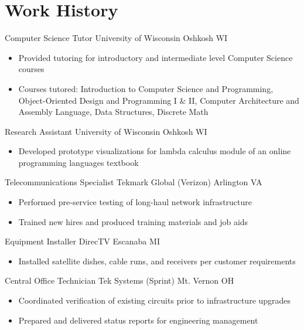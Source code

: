 \documentclass[12pt,letterpaper,sans]{moderncv}
\begin{document}
\section{Work History}
        {Computer Science Tutor}%
        {University of Wisconsin}%
        {Oshkosh}%
        {WI}%
        {\begin{itemize}%
        	\item Provided tutoring for introductory and intermediate level Computer Science courses%
            \item Courses tutored: Introduction to Computer Science and Programming, Object-Oriented Design and Programming I \& II, Computer Architecture and Assembly Language, Data Structures, Discrete Math%
		\end{itemize}}
        {Research Assistant}%
        {University of Wisconsin}%
        {Oshkosh}%
        {WI}%
        {\begin{itemize}%
        	\item Developed prototype visualizations for lambda calculus module of an online programming languages textbook%
		\end{itemize}}        
        {Telecommunications Specialist}%
        {Tekmark Global (Verizon)}%
        {Arlington}%
        {VA}%
        {\begin{itemize}%
        	\item Performed pre-service testing of long-haul network infrastructure%
            \item Trained new hires and produced training materials and job aids%
		\end{itemize}}
        {Equipment Installer}%
        {DirecTV}%
        {Escanaba}%
        {MI}%
        {\begin{itemize}%
        	\item Installed satellite dishes, cable runs, and receivers per customer requirements%
		\end{itemize}}
        {Central Office Technician}%
        {Tek Systems (Sprint)}%
        {Mt. Vernon}%
        {OH}%
        {\begin{itemize}%
        	\item Coordinated verification of existing circuits prior to infrastructure upgrades%
            \item Prepared and delivered status reports for engineering management%
		\end{itemize}}
\end{document}
